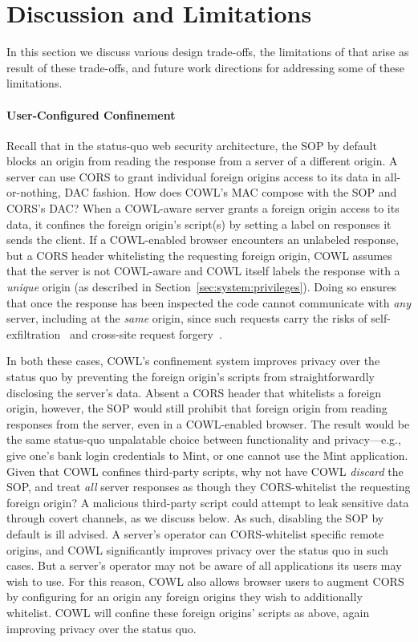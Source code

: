 \section{Discussion and Limitations}
\label{sec:discussion}

In this section we discuss various design trade-offs, the limitations
of \sys{} that arise as result of these trade-offs, and future work
directions for addressing some of these limitations.

\paragraph{User-Configured Confinement}  Recall that in the
status-quo web security architecture, the SOP by default blocks an
origin from reading the response from a server of a different
origin. A server can use CORS to grant individual foreign origins
access to its data in all-or-nothing, DAC fashion. How does COWL's MAC
compose with the SOP and CORS's DAC? When a COWL-aware server grants a
foreign origin access to its data, it confines the foreign origin's
script(s) by setting a label on responses it sends the client. If a
COWL-enabled browser encounters an unlabeled response, but a CORS
header whitelisting the requesting foreign origin, COWL assumes that
the server is not COWL-aware and COWL itself labels the response with
a \emph{unique} origin (as described in
Section~\ref{sec:system:privileges}). Doing so ensures that once the
response has been inspected the code cannot communicate with
\emph{any} server, including at the \emph{same} origin,
since such requests carry the risks of
self-exfiltration~\cite{selfex} and cross-site request
forgery~\cite{CSRF}.

In both these cases, COWL's confinement system improves privacy over
the status quo by preventing the foreign origin's scripts from
straightforwardly disclosing the server's data. Absent a CORS header
that whitelists a foreign origin, however, the SOP would still
prohibit that foreign origin from reading responses from the server,
even in a COWL-enabled browser. The result would be the same
status-quo unpalatable choice between functionality and
privacy---e.g., give one's bank login credentials to Mint, or one
cannot use the Mint application. Given that COWL confines third-party
scripts, why not have COWL {\em discard} the SOP, and treat {\em all}
server responses as though they CORS-whitelist the requesting foreign
origin? A malicious third-party script could attempt to leak sensitive
data through covert channels, as we discuss below. As such, disabling
the SOP by default is ill advised. A server's operator can
CORS-whitelist specific remote origins, and COWL significantly
improves privacy over the status quo in such cases. But a server's
operator may not be aware of all applications its users may wish to
use. For this reason, COWL also allows browser users to augment CORS
by configuring for an origin any foreign origins they wish to
additionally whitelist. COWL will confine these foreign origins'
scripts as above, again improving privacy over the status quo.

